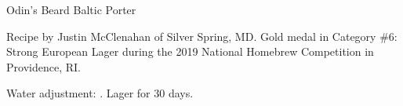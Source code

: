 \begin{recipe}{Odin's Beard Baltic Porter}

\begin{aboutblock}
Recipe by Justin McClenahan of Silver Spring, MD. Gold medal in Category \#6:
Strong European Lager during the 2019 National Homebrew Competition in
Providence, RI. \sourceaha
\end{aboutblock}


\begin{methodandtiming}
 
\begin{mashsteps}
\end{mashsteps}

\begin{fermentationsteps}
\end{fermentationsteps}

\begin{directions}
Water adjustment: . Lager for 30 days.
\end{directions}

\end{methodandtiming}

\recipebreak

\begin{ingredientsblock}

\begin{malts}
\end{malts}

\begin{hops}
\end{hops}

\begin{yeastsx}
\end{yeastsx}

\end{ingredientsblock}

\end{recipe}
